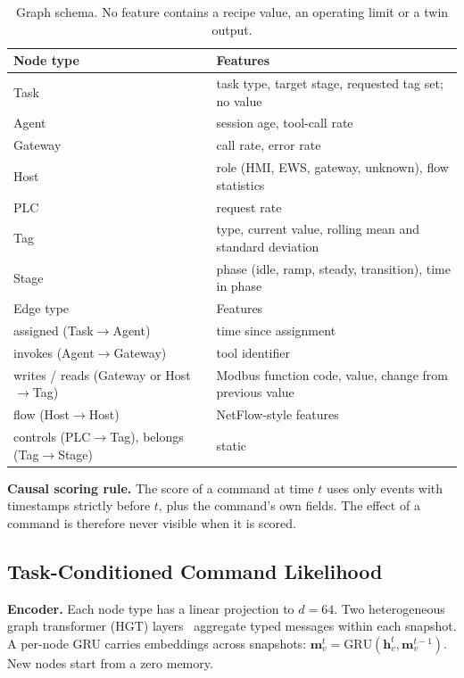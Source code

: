 \documentclass[journal]{IEEEtran}
\begin{document}
\begin{table}[!t]
\centering
\caption{Graph schema. No feature contains a recipe value, an operating limit or a twin output.}
\label{tab:schema}
\footnotesize
\begin{tabular}{p{}p{}}
\toprule
Node type & Features \\
\midrule
Task & task type, target stage, requested tag set; no value \\
Agent & session age, tool-call rate \\
Gateway & call rate, error rate \\
Host & role (HMI, EWS, gateway, unknown), flow statistics \\
PLC & request rate \\
Tag & type, current value, rolling mean and standard deviation \\
Stage & phase (idle, ramp, steady, transition), time in phase \\
\midrule
Edge type & Features \\
\midrule
assigned (Task$\to$Agent) & time since assignment \\
invokes (Agent$\to$Gateway) & tool identifier \\
writes / reads (Gateway or Host$\to$Tag) & Modbus function code, value, change from previous value \\
flow (Host$\to$Host) & NetFlow-style features~\cite{sarhan2022standard} \\
controls (PLC$\to$Tag), belongs (Tag$\to$Stage) & static \\
\bottomrule
\end{tabular}
\end{table}

\textbf{Causal scoring rule.} The score of a command at time $t$ uses only events with timestamps strictly before $t$, plus the command's own fields. The effect of a command is therefore never visible when it is scored.

\subsection{Task-Conditioned Command Likelihood}\label{sec:model}
\textbf{Encoder.} Each node type has a linear projection to $d=64$. Two heterogeneous graph transformer (HGT) layers~\cite{hu2020hgt} aggregate typed messages within each snapshot. A per-node GRU carries embeddings across snapshots: $\mathbf{m}_v^{t}=\mathrm{GRU}(\mathbf{h}_v^{t},\mathbf{m}_v^{t-1})$. New nodes start from a zero memory.
\end{document}
